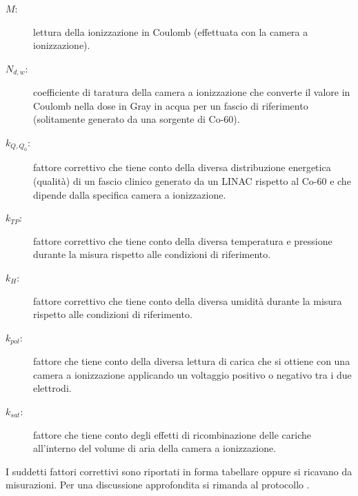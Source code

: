 \begin{description}
\item[$M:$] lettura della ionizzazione in Coulomb (effettuata con la camera a ionizzazione).
\item[$N_{d,w}:$] coefficiente di taratura della camera a ionizzazione che converte il valore in Coulomb nella dose in Gray in acqua per un fascio di riferimento (solitamente generato da una sorgente di Co-60).
\item[$k_{Q,Q_0}:$] fattore correttivo che tiene conto della diversa distribuzione energetica (qualità) di un fascio clinico generato da un LINAC rispetto al Co-60 e che dipende dalla specifica camera a ionizzazione.
\item[$k_{TP}:$] fattore correttivo che tiene conto della diversa temperatura e pressione durante la misura rispetto alle condizioni di riferimento.
\item[$k_{H}:$] fattore correttivo che tiene conto della diversa umidità durante la misura rispetto alle condizioni di riferimento.
\item[$k_{pol}:$] fattore che tiene conto della diversa lettura di carica che si ottiene con una camera a ionizzazione applicando un voltaggio positivo o negativo tra i due elettrodi.
\item[$k_{sat}:$] fattore che tiene conto degli effetti di ricombinazione delle cariche all'interno del volume di aria della camera a ionizzazione.
\end{description}
I suddetti fattori correttivi sono riportati in forma tabellare oppure si ricavano da misurazioni. Per una discussione approfondita si rimanda al protocollo \cite{Andreo2006}.

